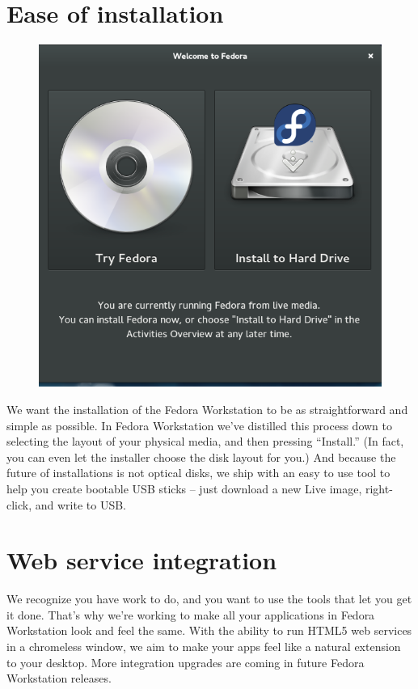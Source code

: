 \documentclass[
10pt
]{leaflet}
\begin{document}
\section{\textcolor{FedoraBlue}{Ease of installation}}
\begin{figure}[h]
  \includegraphics[keepaspectratio,width=\textwidth]{Workstation-anaconda-0-cropped.png}
\end{figure}
We want the installation of the Fedora Workstation to be as straightforward and simple as possible. In Fedora Workstation we've distilled this process down to selecting the layout of your physical media, and then pressing ``Install.'' (In fact, you can even let the installer choose the disk layout for you.) And because the future of installations is not optical disks, we ship with an easy to use tool to help you create bootable USB sticks -- just download a new Live image, right-click, and write to USB.

\section{\textcolor{FedoraBlue}{Web service integration}}
We recognize you have work to do, and you want to use the tools that let you get it done. That's why we're working to make all your applications in Fedora Workstation look and feel the same. With the ability to run HTML5 web services in a chromeless window, we aim to make your apps feel like a natural extension to your desktop. More integration upgrades are coming in future Fedora Workstation releases.
\end{document}
